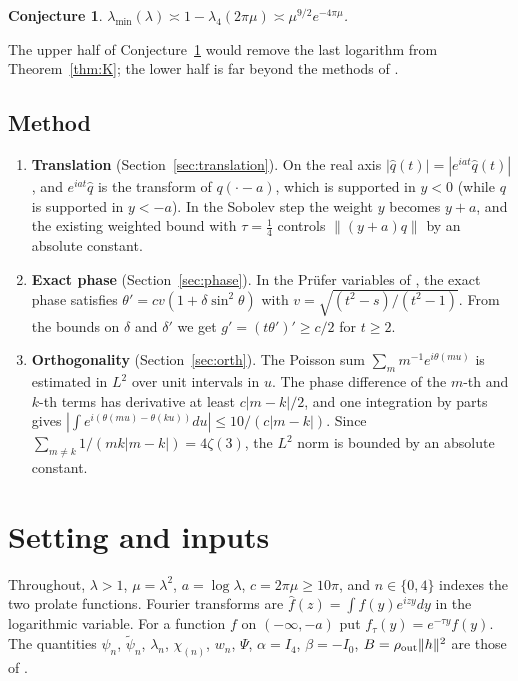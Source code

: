 \documentclass[11pt]{amsart}
\newtheorem{conjecture}[proposition]{Conjecture}
\theoremstyle{remark}
\numberwithin{equation}{section}
\begin{document}
\begin{conjecture}\label{conj}
$\lambda_{\min}(\lambda)\asymp1-\lambda_4(2\pi\mu)\asymp\mu^{9/2}e^{-4\pi\mu}$.
\end{conjecture}

The upper half of Conjecture~\ref{conj} would remove the last logarithm from Theorem~\ref{thm:K}; the lower half is far beyond the methods of \cite{MoriWeilIV}.

\subsection{Method}
\begin{enumerate}
\item \textbf{Translation} (Section~\ref{sec:translation}). On the real axis $|\hat q(t)|=|e^{iat}\hat q(t)|$, and $e^{iat}\hat q$ is the transform of $q(\cdot-a)$, which is supported in $y<0$ (while $q$ is supported in $y<-a$). In the Sobolev step the weight $y$ becomes $y+a$, and the existing weighted bound with $\tau=\frac14$ controls $\|(y+a)q\|$ by an absolute constant.
\item \textbf{Exact phase} (Section~\ref{sec:phase}). In the Pr\"ufer variables of \cite[Lemmas~3.2 and~3.6]{MoriWeilII}, the exact phase satisfies $\theta'=cv(1+\delta\sin^2\theta)$ with $v=\sqrt{(t^2-s)/(t^2-1)}$. From the bounds on $\delta$ and $\delta'$ we get $g'=(t\theta')'\ge c/2$ for $t\ge2$.
\item \textbf{Orthogonality} (Section~\ref{sec:orth}). The Poisson sum $\sum_m m^{-1}e^{i\theta(mu)}$ is estimated in $L^2$ over unit intervals in $u$. The phase difference of the $m$-th and $k$-th terms has derivative at least $c|m-k|/2$, and one integration by parts gives $|\int e^{i(\theta(mu)-\theta(ku))}du|\le10/(c|m-k|)$. Since $\sum_{m\ne k}1/(mk|m-k|)=4\zeta(3)$, the $L^2$ norm is bounded by an absolute constant.
\end{enumerate}

\section{Setting and inputs}\label{sec:setting}

Throughout, $\lambda>1$, $\mu=\lambda^2$, $a=\log\lambda$, $c=2\pi\mu\ge10\pi$, and $n\in\{0,4\}$ indexes the two prolate functions. Fourier transforms are $\hat f(z)=\int f(y)e^{izy}dy$ in the logarithmic variable. For a function $f$ on $(-\infty,-a)$ put $f_\tau(y)=e^{-\tau y}f(y)$. The quantities $\psi_n$, $\tilde\psi_n$, $\lambda_n$, $\chi_{(n)}$, $w_n$, $\Psi$, $\alpha=I_4$, $\beta=-I_0$, $B=\rho_{\rm out}\|h\|^2$ are those of \cite[Section~2]{MoriWeilII}.
\end{document}
